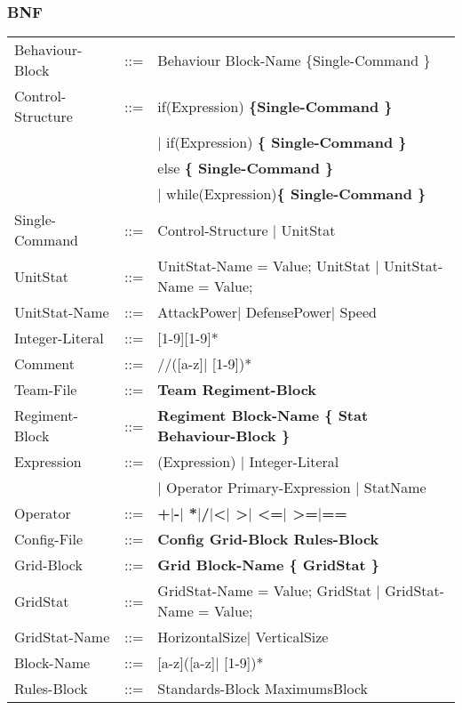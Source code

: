 	\subsubsection{BNF}
		\begin{tabular}{ l l l }
			Behaviour-Block	   &	::=	 & Behaviour Block-Name \{Single-Command \} \\
			Control-Structure  &  	::=  & if(Expression) \bf{\{}Single-Command \bf{\}}  \\
							   &		 & $\mid$ if(Expression) \bf{\{ }Single-Command \bf{\}} \\
							   &   		 & else \bf{\{ }Single-Command \bf{\} } \\					   
							   &   		 & $\mid$ while(Expression)\bf{\{ } Single-Command \bf{\}} \\
			Single-Command     &	::=  & Control-Structure $\mid$ UnitStat \\
			UnitStat		   &	::=  & UnitStat-Name = Value; UnitStat $\mid$ UnitStat-Name = Value; \\
			UnitStat-Name	   &	::=	 & AttackPower$\mid$ DefensePower$\mid$ Speed \\
			Integer-Literal    &	::=  & [1-9][1-9]* \\
			Comment			   &	::=	 & //([a-z]$\mid$ [1-9])* \\
			Team-File		   &	::=	 & \bf{Team} Regiment-Block \\
			Regiment-Block     &	::=	 & \bf{Regiment} Block-Name	 \bf{\{ } Stat Behaviour-Block \bf{\} }\\
			Expression		   &	::=  & (Expression) $\mid$ Integer-Literal \\
							   &		 &	$\mid$ Operator Primary-Expression $\mid$ StatName \\
			Operator 		   & 	::=	 & \bf{+}$\mid$\bf{-}$\mid$ \bf{*}$\mid$\bf{/}$\mid$\bf{<}$\mid$ \bf{>}$\mid$ \bf{<=}$\mid$ \bf{>=}$\mid$\bf{==}\\
			Config-File		   & 	::=  & \bf{Config} Grid-Block Rules-Block  		\\
			Grid-Block		   &	::=	 & \bf{Grid} Block-Name	 \bf{\{} GridStat \bf{\}} \\
			GridStat		   &	::=  & GridStat-Name = Value; GridStat $\mid$ GridStat-Name = Value;   \\
			GridStat-Name	   &	::=  & HorizontalSize$\mid$ VerticalSize					\\
			Block-Name		   &	::=  & [a-z]([a-z]$\mid$ [1-9])* 							\\
			Rules-Block		   &	::=	 & Standards-Block MaximumsBlock 				\\

\end{tabular}
